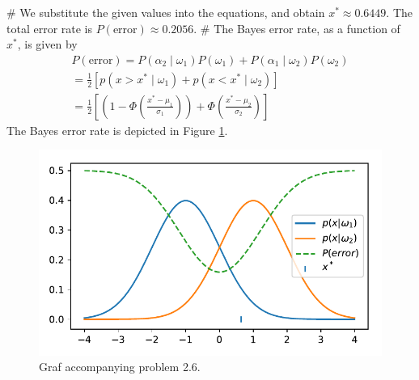 \documentclass[12pt, a4paper]{article}
\begin{document}
\begin{easylist}[enumerate]
# We substitute the given values into the equations, and obtain $x^* \approx 0.6449$. The total error rate is $P(\text{error}) \approx 0.2056$.
# The Bayes error rate, as a function of $x^*$, is given by
\begin{align*}
	P(\text{error}) = P(\alpha_2  \mid  \omega_1) P(\omega_1) + P(\alpha_1 \mid  \omega_2) P(\omega_2) \\
	= \frac{1}{2} \left[ p( x > x^* \mid  \omega_1)  + p( x < x^*  \mid  \omega_2) \right]   \\
	= \frac{1}{2} \left[ \left( 1 - \Phi \left( \frac{x^* - \mu_1}{\sigma_1}\right)\right) +  \Phi \left( \frac{x^* - \mu_2}{\sigma_2}\right)  \right]
\end{align*}
The Bayes error rate is depicted in Figure \ref{fig:duda_ch2_prob6}.

\begin{figure}[ht!]
\centering
\includegraphics[width=0.5\linewidth]{figs/duda_ch2_prob6}
\caption{Graf accompanying problem 2.6.}
\label{fig:duda_ch2_prob6}
\end{figure}


\end{easylist}
\end{document}
